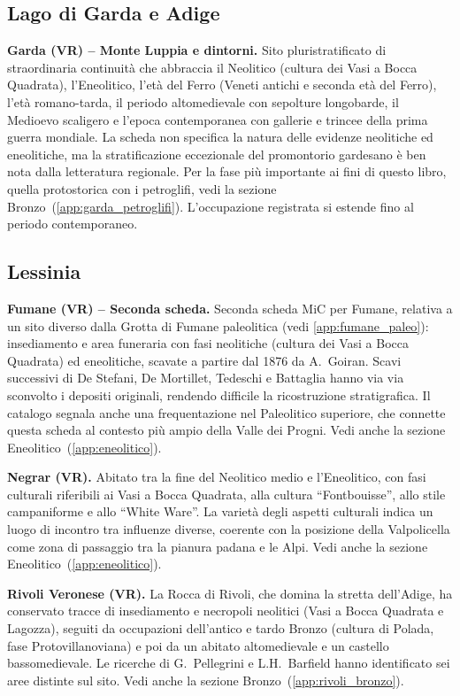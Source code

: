 \subsection{Lago di Garda e Adige}

\textbf{Garda (VR) -- Monte Luppia e dintorni.} \label{app:garda_neo} Sito pluristratificato di straordinaria continuità che abbraccia il Neolitico (cultura dei Vasi a Bocca Quadrata), l'Eneolitico, l'età del Ferro (Veneti antichi e seconda età del Ferro), l'età romano-tarda, il periodo altomedievale con sepolture longobarde, il Medioevo scaligero e l'epoca contemporanea con gallerie e trincee della prima guerra mondiale. La scheda non specifica la natura delle evidenze neolitiche ed eneolitiche, ma la stratificazione eccezionale del promontorio gardesano è ben nota dalla letteratura regionale. Per la fase più importante ai fini di questo libro, quella protostorica con i petroglifi, vedi la sezione Bronzo~(\ref{app:garda_petroglifi}). L'occupazione registrata si estende fino al periodo contemporaneo.

\subsection{Lessinia}

\textbf{Fumane (VR) -- Seconda scheda.} \label{app:fumane_neo} Seconda scheda MiC per Fumane, relativa a un sito diverso dalla Grotta di Fumane paleolitica (vedi \ref{app:fumane_paleo}): insediamento e area funeraria con fasi neolitiche (cultura dei Vasi a Bocca Quadrata) ed eneolitiche, scavate a partire dal 1876 da A.~Goiran. Scavi successivi di De Stefani, De Mortillet, Tedeschi e Battaglia hanno via via sconvolto i depositi originali, rendendo difficile la ricostruzione stratigrafica. Il catalogo segnala anche una frequentazione nel Paleolitico superiore, che connette questa scheda al contesto più ampio della Valle dei Progni. Vedi anche la sezione Eneolitico~(\ref{app:eneolitico}).

\textbf{Negrar (VR).} \label{app:negrar} Abitato tra la fine del Neolitico medio e l'Eneolitico, con fasi culturali riferibili ai Vasi a Bocca Quadrata, alla cultura ``Fontbouisse'', allo stile campaniforme e allo ``White Ware''. La varietà degli aspetti culturali indica un luogo di incontro tra influenze diverse, coerente con la posizione della Valpolicella come zona di passaggio tra la pianura padana e le Alpi. Vedi anche la sezione Eneolitico~(\ref{app:eneolitico}).

\textbf{Rivoli Veronese (VR).} \label{app:rivoli} La Rocca di Rivoli, che domina la stretta dell'Adige, ha conservato tracce di insediamento e necropoli neolitici (Vasi a Bocca Quadrata e Lagozza), seguiti da occupazioni dell'antico e tardo Bronzo (cultura di Polada, fase Protovillanoviana) e poi da un abitato altomedievale e un castello bassomedievale. Le ricerche di G.~Pellegrini e L.H.~Barfield hanno identificato sei aree distinte sul sito. Vedi anche la sezione Bronzo~(\ref{app:rivoli_bronzo}).

